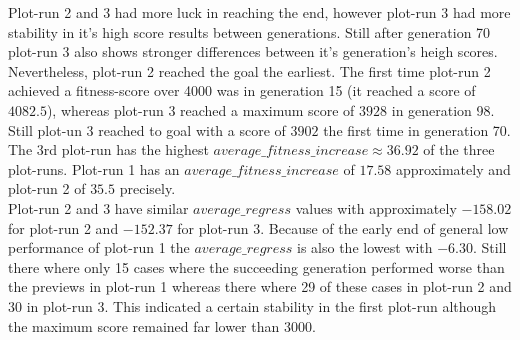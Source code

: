			Plot-run 2 and 3 had more luck in reaching the end, however plot-run 3 had more stability in it's high score results between generations. Still after generation 70 plot-run 3 also shows stronger differences between it's generation's heigh scores. Nevertheless, plot-run 2 reached the goal the earliest. The first time plot-run 2 achieved a fitness-score over 4000 was in generation 15 (it reached a score of $4082.5$), whereas plot-run 3 reached a maximum score of $3928$ in generation 98. Still plot-un 3 reached to goal with a score of $3902$ the first time in generation 70. The 3rd plot-run has the highest $average\_fitness\_increase\approx36.92$ of the three plot-runs. Plot-run 1 has an $average\_fitness\_increase$ of $17.58$ approximately and plot-run 2 of $35.5$ precisely.\\
			Plot-run 2 and 3 have similar $average\_regress$ values with approximately $-158.02$ for plot-run 2 and $-152.37$ for plot-run 3. Because of the early end of general low performance of plot-run 1 the $average\_regress$ is also the lowest with $-6.30$. Still there where only 15 cases where the succeeding generation performed worse than the previews in plot-run 1 whereas there where 29 of these cases in plot-run 2 and 30 in plot-run 3. This indicated a certain stability in the first plot-run although the maximum score remained far lower than $3000$.
		
		
